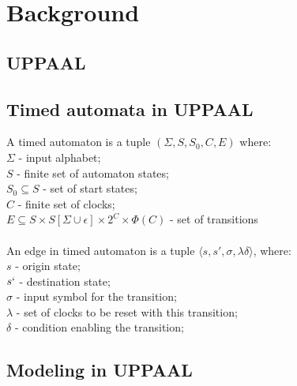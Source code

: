 \section{Background}

\subsection{UPPAAL}



\subsection{Timed automata in UPPAAL}
\begin{definition}
A timed automaton is a tuple $(\Sigma, S, S_0, C, E)$ where:\\
$\Sigma$ - input alphabet;\\
$S$ - finite set of automaton states;\\
$S_0 \subseteq S$ - set of start states; \\
$C$ - finite set of clocks; \\
$E \subseteq S \times S [\Sigma \cup {\epsilon}] \times 2^C \times \Phi(C)$ - set of transitions\\\\
An edge in timed automaton is a tuple $\langle s, s', \sigma, \lambda \delta \rangle$, where:\\
$s$ - origin state;\\
$s`$ - destination state;\\
$\sigma$ - input symbol for the transition;\\
$\lambda$ - set of clocks to be reset with this transition;\\
$\delta$ - condition enabling the transition;\\
\label{def:automaton}
\end{definition}


\subsection{Modeling in UPPAAL}



